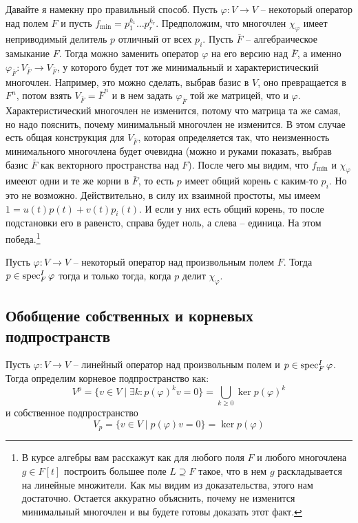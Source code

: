 \begin{itemize}
Давайте я намекну про правильный способ. Пусть $\varphi\colon V\to V$ -- некоторый оператор над полем $F$ и пусть $f_\text{min} = p_1^{k_1}\ldots p_r^{k_r}$. Предположим, что многочлен $\chi_\varphi$ имеет неприводимый делитель $p$ отличный от всех $p_i$. Пусть $\bar F$ -- алгебраическое замыкание $F$. Тогда можно заменить оператор $\varphi$ на его версию над $\bar F$, а именно $\varphi_{\bar F}\colon V_{\bar F}\to V_{\bar F}$, у которого будет тот же минимальный и характеристический многочлен. Например, это можно сделать, выбрав базис в $V$, оно превращается в $F^n$, потом взять $V_{\bar F} = \bar F^n$ и в нем задать $\varphi_{\bar F}$ той же матрицей, что и $\varphi$. Характеристический многочлен не изменится, потому что матрица та же самая, но надо пояснить, почему минимальный многочлен не изменится. В этом случае есть общая конструкция для $V_{\bar F}$, которая определяется так, что неизменность минимального многочлена будет очевидна (можно и руками показать, выбрав базис $\bar F$ как векторного пространства над $F$). После чего мы видим, что $f_\text{min}$ и $\chi_\varphi$ имееют одни и те же корни в $\bar F$, то есть $p$ имеет общий корень с каким-то $p_i$. Но это не возможно. Действительно, в силу их взаимной простоты, мы имеем $1 = u(t) p(t) + v(t) p_i(t)$. И если у них есть общий корень, то после подстановки его в равенсто, справа будет ноль, а слева -- единица. На этом победа.\footnote{В курсе алгебры вам расскажут как для любого поля $F$ и любого многочлена $g\in F[t]$ построить большее поле $L\supseteq F$ такое, что в нем $g$ раскладывается на линейные множители. Как мы видим из доказательства, этого нам достаточно. Остается аккуратно объяснить, почему не изменится минимальный многочлен и вы будете готовы доказать этот факт.}
\end{itemize}

\begin{claim}[БД]
Пусть $\varphi\colon V\to V$ -- некоторый оператор над произвольным полем $F$. Тогда $p\in \operatorname{spec}_F^I \varphi$ тогда и только тогда, когда $p$ делит $\chi_\varphi$.
\end{claim}

\subsection{Обобщение собственных и корневых подпространств}

\begin{definition}
Пусть $\varphi\colon V\to V$ -- линейный оператор над произвольным полем и $p\in \operatorname{spec}_F^I \varphi$. Тогда определим корневое подпространство как:
\[
V^p = \{v\in V\mid \exists k\colon p(\varphi)^k v = 0\} = \bigcup_{k\geqslant 0}\ker p(\varphi)^k
\]
и собственное подпространство
\[
V_p =\{v\in V \mid p(\varphi)v = 0\} = \ker p(\varphi)
\]
\end{definition}

